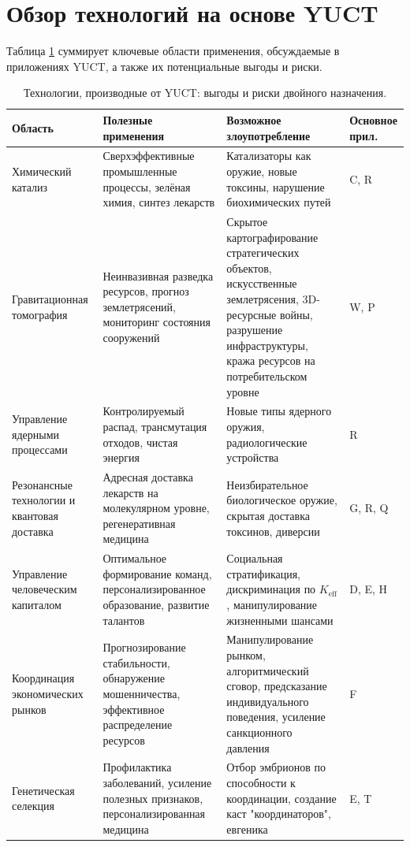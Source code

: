 \documentclass[12pt,a4paper]{article}
\theoremstyle{remark}
\newcommand{\Keff}{K_{\mathrm{eff}}}
\begin{document}
	\section{Обзор технологий на основе YUCT}
	\label{sec:overview}
	
	Таблица \ref{tab:tech-summary} суммирует ключевые области применения, обсуждаемые в приложениях YUCT, а также их потенциальные выгоды и риски.
	
	\begin{table}[htbp]
		\centering
		\caption{Технологии, производные от YUCT: выгоды и риски двойного назначения.}
		\label{tab:tech-summary}
		\small
		\begin{tabularx}{\textwidth}{p{2.8cm}Xp{3.5cm}p{2.5cm}}
			\toprule
			\textbf{Область} & \textbf{Полезные применения} & \textbf{Возможное злоупотребление} & \textbf{Основное прил.} \\
			\midrule
			Химический катализ & Сверхэффективные промышленные процессы, зелёная химия, синтез лекарств & Катализаторы как оружие, новые токсины, нарушение биохимических путей & C, R \\
			Гравитационная томография & Неинвазивная разведка ресурсов, прогноз землетрясений, мониторинг состояния сооружений & Скрытое картографирование стратегических объектов, искусственные землетрясения, 3D-ресурсные войны, разрушение инфраструктуры, кража ресурсов на потребительском уровне & W, P \\
			Управление ядерными процессами & Контролируемый распад, трансмутация отходов, чистая энергия & Новые типы ядерного оружия, радиологические устройства & R \\
			Резонансные технологии и квантовая доставка & Адресная доставка лекарств на молекулярном уровне, регенеративная медицина & Неизбирательное биологическое оружие, скрытая доставка токсинов, диверсии & G, R, Q \\
			Управление человеческим капиталом & Оптимальное формирование команд, персонализированное образование, развитие талантов & Социальная стратификация, дискриминация по \(\Keff\), манипулирование жизненными шансами & D, E, H \\
			Координация экономических рынков & Прогнозирование стабильности, обнаружение мошенничества, эффективное распределение ресурсов & Манипулирование рынком, алгоритмический сговор, предсказание индивидуального поведения, усиление санкционного давления & F \\
			Генетическая селекция & Профилактика заболеваний, усиление полезных признаков, персонализированная медицина & Отбор эмбрионов по способности к координации, создание каст "координаторов", евгеника & E, T \\

\end{tabularx}
\end{table}
\end{document}
